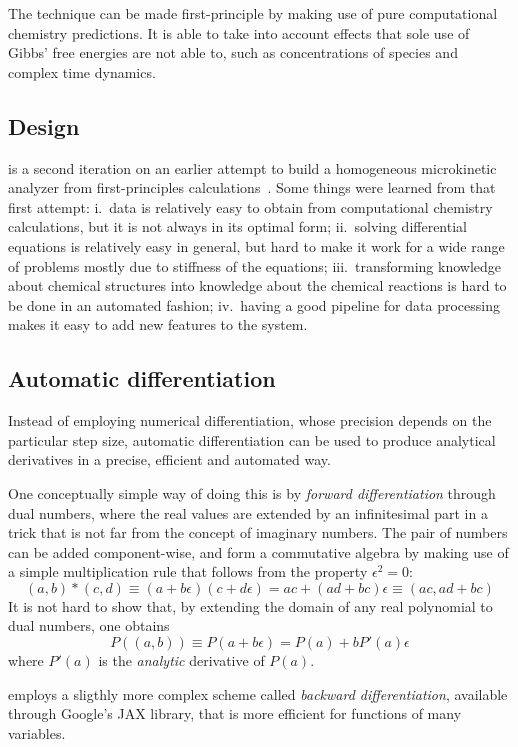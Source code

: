 The technique can be made first-principle by making use of pure computational
chemistry predictions.
It is able to take into account effects that sole use of Gibbs' free energies
are not able to, such as concentrations of species and complex time dynamics.



\subsection{Design}

\overreact{} is a second iteration on an earlier attempt to build a
homogeneous microkinetic analyzer from first-principles
calculations~\cite{pyrrole2019zenodo}.
Some things were learned from that first attempt:
i.\ data is relatively easy to obtain from computational chemistry calculations,
but it is not always in its optimal form;
ii.\ solving differential equations is relatively easy in general, but hard to
make it work for a wide range of problems mostly due to stiffness of the
equations;
iii.\ transforming knowledge about chemical structures into knowledge about the
chemical reactions is hard to be done in an automated fashion;
iv.\ having a good pipeline for data processing makes it easy to add new
features to the system.

\subsection{Automatic differentiation}

Instead of employing numerical differentiation, whose precision depends on the
particular step size, automatic differentiation can be used to produce
analytical derivatives in a precise, efficient and automated way.

One conceptually simple way of doing this is by \emph{forward differentiation}
through dual numbers, where the real values are extended by an infinitesimal
part in a trick that is not far from the concept of imaginary numbers.
The pair of numbers can be added component-wise, and form a commutative algebra
by making use of a simple multiplication rule that follows from the property
$\epsilon^2 = 0$:
\begin{equation}
    (a, b) * (c, d)
    \equiv (a + b\epsilon)(c + d\epsilon)
    = a c + (a d + b c)\epsilon
    \equiv (a c, a d + b c)
\end{equation}
It is not hard to show that, by extending the domain of any real polynomial to
dual numbers, one obtains
\begin{equation}
    P((a, b)) \equiv P(a + b\epsilon) = P(a) + b P'(a) \epsilon
\end{equation}
where $P'(a)$ is the \emph{analytic} derivative of $P(a)$.

\overreact{} employs a sligthly more complex scheme called
\emph{backward differentiation}, available through Google's JAX library, that
is more efficient for functions of many variables.
